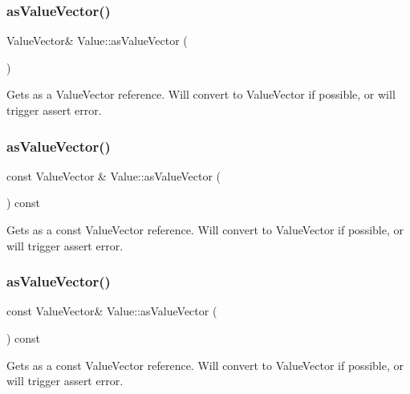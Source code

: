 \subsubsection{\texorpdfstring{as\+Value\+Vector()}{asValueVector()}\hspace{0.1cm}{\footnotesize\ttfamily [2/4]}}
{\footnotesize\ttfamily Value\+Vector\& Value\+::as\+Value\+Vector (\begin{DoxyParamCaption}{ }\end{DoxyParamCaption})}

Gets as a Value\+Vector reference. Will convert to Value\+Vector if possible, or will trigger assert error. \mbox{\label{classValue_a696b27df0fbf6a0b22fbfc7c054c34a7}} 
\subsubsection{\texorpdfstring{as\+Value\+Vector()}{asValueVector()}\hspace{0.1cm}{\footnotesize\ttfamily [3/4]}}
{\footnotesize\ttfamily const Value\+Vector \& Value\+::as\+Value\+Vector (\begin{DoxyParamCaption}{ }\end{DoxyParamCaption}) const}

Gets as a const Value\+Vector reference. Will convert to Value\+Vector if possible, or will trigger assert error. \mbox{\label{classValue_a658fe03730cb05f24e1685f4f6aa4f9e}} 
\subsubsection{\texorpdfstring{as\+Value\+Vector()}{asValueVector()}\hspace{0.1cm}{\footnotesize\ttfamily [4/4]}}
{\footnotesize\ttfamily const Value\+Vector\& Value\+::as\+Value\+Vector (\begin{DoxyParamCaption}{ }\end{DoxyParamCaption}) const}

Gets as a const Value\+Vector reference. Will convert to Value\+Vector if possible, or will trigger assert error. \mbox{\label{classValue_af1c0374c880e1543ff000bc6103c4441}} 

